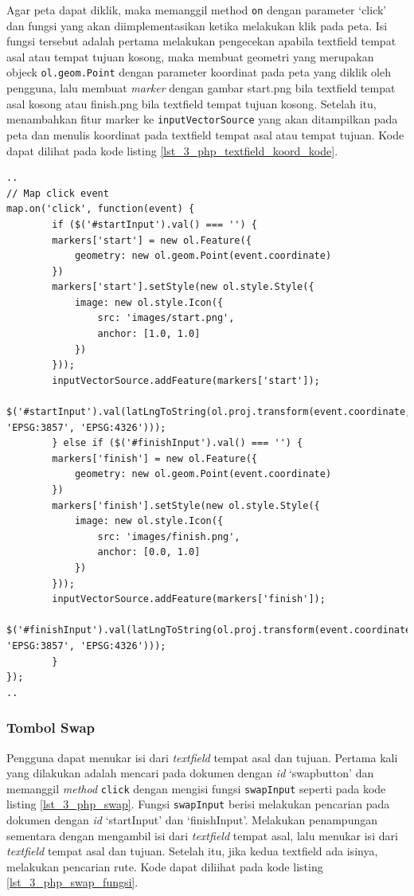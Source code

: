 \begin{enumerate}
	Agar peta dapat diklik, maka memanggil method \verb!on! dengan parameter `click' dan fungsi yang akan diimplementasikan ketika melakukan klik pada peta. Isi fungsi tersebut adalah pertama melakukan pengecekan apabila textfield tempat asal atau tempat tujuan kosong, maka membuat geometri yang merupakan objeck \verb!ol.geom.Point! dengan parameter koordinat pada peta yang diklik oleh pengguna, lalu membuat \textit{marker} dengan gambar start.png bila textfield tempat asal kosong atau finish.png bila textfield tempat tujuan kosong. Setelah itu, menambahkan fitur marker ke \verb!inputVectorSource! yang akan ditampilkan pada peta dan menulis koordinat pada textfield tempat asal atau tempat tujuan. Kode dapat dilihat pada kode listing \ref{lst_3_php_textfield_koord_kode}.
	
	\begin{lstlisting}[caption=Membuat \textit{event} klik pada peta,label = {lst_3_php_textfield_koord_kode}]
..
// Map click event
map.on('click', function(event) {
    	if ($('#startInput').val() === '') {
		markers['start'] = new ol.Feature({
			geometry: new ol.geom.Point(event.coordinate)
		})
		markers['start'].setStyle(new ol.style.Style({
			image: new ol.style.Icon({
				src: 'images/start.png',
				anchor: [1.0, 1.0]
			})
		}));
		inputVectorSource.addFeature(markers['start']);
    		$('#startInput').val(latLngToString(ol.proj.transform(event.coordinate, 'EPSG:3857', 'EPSG:4326')));
    	} else if ($('#finishInput').val() === '') {
		markers['finish'] = new ol.Feature({
			geometry: new ol.geom.Point(event.coordinate)
		})
		markers['finish'].setStyle(new ol.style.Style({
			image: new ol.style.Icon({
				src: 'images/finish.png',
				anchor: [0.0, 1.0]
			})
		}));
		inputVectorSource.addFeature(markers['finish']);
    		$('#finishInput').val(latLngToString(ol.proj.transform(event.coordinate, 'EPSG:3857', 'EPSG:4326')));
    	}
});
..
\end{lstlisting}

\end{enumerate}

\subsubsection{Tombol Swap}
Pengguna dapat menukar isi dari \textit{textfield} tempat asal dan tujuan. Pertama kali yang dilakukan adalah mencari pada dokumen dengan \textit{id} `swapbutton' dan memanggil \textit{method} \verb!click! dengan mengisi fungsi \verb!swapInput! seperti pada kode listing \ref{lst_3_php_swap}. Fungsi \verb!swapInput! berisi melakukan pencarian pada dokumen dengan \textit{id} `startInput' dan `finishInput'. Melakukan penampungan sementara dengan mengambil isi dari \textit{textfield} tempat asal, lalu menukar isi dari \textit{textfield} tempat asal dan tujuan. Setelah itu, jika kedua textfield ada isinya, melakukan pencarian rute. Kode dapat diliihat pada kode listing \ref{lst_3_php_swap_fungsi}.

